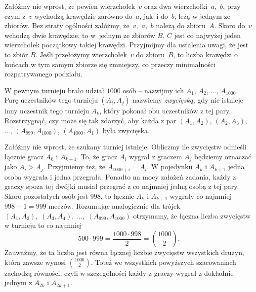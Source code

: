 \noindent
Załóżmy nie wprost, że pewien wierzchołek~$v$ oraz dwa wierzchołki~$a$,~$b$, przy czym z~$v$ wychodzą krawędzie zarówno do~$a$, jak~i do~$b$, leżą w jednym ze zbiorów. Bez straty ogólności załóżmy, że~$v$,~$a$,~$b$ należą do zbioru~$A$. Skoro do~$v$ wchodzą dwie krawędzie, to w~jednym ze zbiorów $B$, $C$ jest co najwyżej jeden wierzchołek początkowy takiej krawędzi. Przyjmijmy dla ustalenia uwagi, że jest to zbiór $B$. Jeśli przełożymy wierzchołek~$v$ do zbioru~$B$, to liczba krawędzi o końcach w tym samym zbiorze się zmniejszy, co przeczy minimalności rozpatrywanego podziału.

\begin{problem}{4}
	W pewnym turnieju brało udział $1000$ osób -- nazwijmy ich $A_1$, $A_2$, ..., $A_{1000}$. Parę uczestników tego turnieju $(A_i, A_j)$ nazwiemy \textit{zwycięską}, gdy nie istnieje inny uczestnik tego turnieju $A_k$, który pokonał obu uczestników z tej pary. Rozstrzygnąć, czy może się tak zdarzyć, aby każda z par $(A_1, A_2)$, $(A_2, A_3)$, ..., $(A_{999}, A_{1000})$, $(A_{1000}, A_{1})$ była zwycięska.
\end{problem}


\noindent
Załóżmy nie wprost, że szukany turniej istnieje. Obliczmy ile zwycięstw odnieśli łącznie gracz $A_{k}$ i $A_{k + 1}$. To, że gracz $A_i$ wygrał z graczem $A_j$ będziemy oznaczać jako $A_i > A_j$. Przyjmiemy też, że $A_{1000 + i} = A_i$. W pojedynku $A_{k}$ i $A_{k + 1}$ jedna osoba wygrała i jedna przegrała. Ponadto na mocy założeń zadania, każdy z graczy spoza tej dwójki musiał przegrać z co najmniej jedną osobą z tej pary. Skoro pozostałych osób jest $998$, to łącznie $A_{k}$ i $A_{k + 1}$ wygrały co najmniej $998 + 1 = 999$ meczów. Rozumując analogicznie dla trójek $(A_1, A_2), \; (A_3, A_4), \; ...,\; (A_{999}, A_{1000})$ otrzymamy, że łączna liczba zwycięstw w turnieju to co najmniej 
\[
	500 \cdot 999 = \frac{1000 \cdot 998}{2} = {{1000}\choose{2}}.
\] 
Zauważmy, że ta liczba jest równa łącznej liczbie zwycięstw wszystkich drużyn, która zawsze wynosi ${{1000}\choose{2}}$. Toteż we wszystkich powyższych szacowaniach zachodzą równości, czyli w szczególności każdy z graczy wygrał z dokładnie jednym z $A_{2k}$ i $A_{2k + 1}$.

\begin{center}
\end{center}

